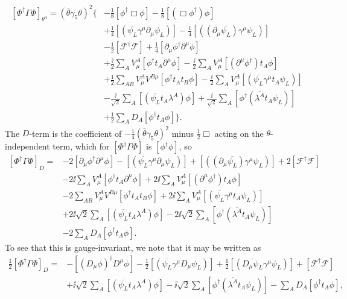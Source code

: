 \[
  \begin{aligned}
  \left[\Phi^\dagger\Gamma\Phi\right]_{\theta^4}
  =(\bar\theta\gamma_5\theta)^2\biggl\{&
  -\frac18[\phi^\dagger\Box\phi]
  -\frac18[(\Box\phi^\dagger)\phi]
  \\
  &+\frac14[(\overline{\psi_L}\gamma^\mu\partial_\mu\psi_L)]
  -\frac14[((\partial_\mu\overline{\psi_L})\gamma^\mu\psi_L)]
  \\
  &-\frac12[\mathcal{F}^\dagger\mathcal{F}]
  +\frac14[\partial_\mu\phi^\dagger\partial^\mu\phi]
  \\
  &+\frac{\ii}{2}\sum_A V^A_\mu
    [\phi^\dagger t_A\partial^\mu\phi]
  -\frac{\ii}{2}\sum_A V^A_\mu
    [(\partial^\mu\phi^\dagger)t_A\phi]
  \\
  &+\frac12\sum_{AB}V^A_\mu V^{B\mu}
    [\phi^\dagger t_At_B\phi]
  -\frac{\ii}{2}\sum_A V^A_\mu
    [(\overline{\psi_L}\gamma^\mu t_A\psi_L)]
  \\
  &-\frac{\ii}{\sqrt{2}}\sum_A
    [(\overline{\psi_L}t_A\lambda^A)\phi]
  +\frac{\ii}{\sqrt{2}}\sum_A
    [\phi^\dagger(\overline{\lambda^A}t_A\psi_L)]
  \\
  &+\frac12\sum_A D_A[\phi^\dagger t_A\phi]
  \biggr\}.
  \end{aligned}
\]
The \(D\)-term is the coefficient of
\(-\tfrac14(\bar\theta\gamma_5\theta)^2\) minus \(\tfrac12\Box\) acting
on the \(\theta\)-independent term, which for
\([\Phi^\dagger\Gamma\Phi]\) is \([\phi^\dagger\phi]\), so
\[
  \begin{aligned}
  [\Phi^\dagger\Gamma\Phi]_D={}&
  -2[\partial_\mu\phi^\dagger\partial^\mu\phi]
  -[(\overline{\psi_L}\gamma^\mu\partial_\mu\psi_L)]
  +[((\partial_\mu\overline{\psi_L})\gamma^\mu\psi_L)]
  +2[\mathcal{F}^\dagger\mathcal{F}]
  \\
  &-2\ii\sum_A V^A_\mu[\phi^\dagger t_A\partial^\mu\phi]
  +2\ii\sum_A V^A_\mu[(\partial^\mu\phi^\dagger)t_A\phi]
  \\
  &-2\sum_{AB}V^A_\mu V^{B\mu}
    [\phi^\dagger t_At_B\phi]
  +2\ii\sum_A V^A_\mu
    [(\overline{\psi_L}\gamma^\mu t_A\psi_L)]
  \\
  &+2\ii\sqrt{2}\sum_A[(\overline{\psi_L}t_A\lambda^A)\phi]
  -2\ii\sqrt{2}\sum_A[\phi^\dagger(\overline{\lambda^A}t_A\psi_L)]
  \\
  &-2\sum_A D_A[\phi^\dagger t_A\phi].
  \end{aligned}
\]
To see that this is gauge-invariant, we note that it may be written as
\begin{equation}
  \begin{aligned}
  \frac12[\Phi^\dagger\Gamma\Phi]_D={}&
  -[(D_\mu\phi)^\dagger D^\mu\phi]
  -\frac12[(\overline{\psi_L}\gamma^\mu D_\mu\psi_L)]
  +\frac12[(\overline{D_\mu\psi_L}\gamma^\mu\psi_L)]
  +[\mathcal{F}^\dagger\mathcal{F}]
  \\
  &+\ii\sqrt{2}\sum_A[(\overline{\psi_L}t_A\lambda^A)\phi]
  -\ii\sqrt{2}\sum_A[\phi^\dagger(\overline{\lambda^A}t_A\psi_L)]
  -\sum_A D_A[\phi^\dagger t_A\phi],
  \end{aligned}
  \tag{27.1.27}\label{eq:27.1.27}
\end{equation}
